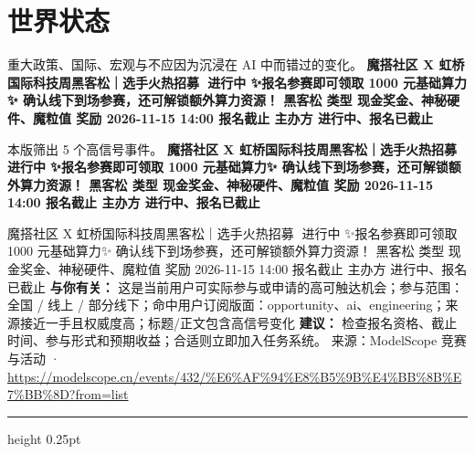 \documentclass[10.5pt]{ctexart}
\begin{document}
\section*{世界状态}
{\color{ormuted} 重大政策、国际、宏观与不应因为沉浸在 AI 中而错过的变化。}
\vspace{2mm}
{\LARGE\bfseries 魔搭社区 X 虹桥国际科技周黑客松｜选手火热招募🚀 进行中 ✨报名参赛即可领取 1000 元基础算力✨ 确认线下到场参赛，还可解锁额外算力资源！ 黑客松 类型 现金奖金、神秘硬件、魔粒值 奖励 2026-11-15 14:00 报名截止 主办方 进行中、报名已截止}\par
\vspace{1mm}
{\color{ormuted} 本版筛出 5 个高信号事件。}
\vspace{3mm}
{\Large\bfseries 魔搭社区 X 虹桥国际科技周黑客松｜选手火热招募🚀 进行中 ✨报名参赛即可领取 1000 元基础算力✨ 确认线下到场参赛，还可解锁额外算力资源！ 黑客松 类型 现金奖金、神秘硬件、魔粒值 奖励 2026-11-15 14:00 报名截止 主办方 进行中、报名已截止}\par
魔搭社区 X 虹桥国际科技周黑客松｜选手火热招募🚀 进行中 ✨报名参赛即可领取 1000 元基础算力✨ 确认线下到场参赛，还可解锁额外算力资源！ 黑客松 类型 现金奖金、神秘硬件、魔粒值 奖励 2026-11-15 14:00 报名截止 主办方 进行中、报名已截止
\textbf{与你有关：} 这是当前用户可实际参与或申请的高可触达机会；参与范围：全国 / 线上 / 部分线下；命中用户订阅版面：opportunity、ai、engineering；来源接近一手且权威度高；标题/正文包含高信号变化
\textbf{建议：} 检查报名资格、截止时间、参与形式和预期收益；合适则立即加入任务系统。
{\footnotesize\color{ormuted} 来源：ModelScope 竞赛与活动 · \url{https://modelscope.cn/events/432/%E6%AF%94%E8%B5%9B%E4%BB%8B%E7%BB%8D?from=list}}
\vspace{4mm}
\hrule height 0.25pt
\vspace{3mm}
\end{document}
